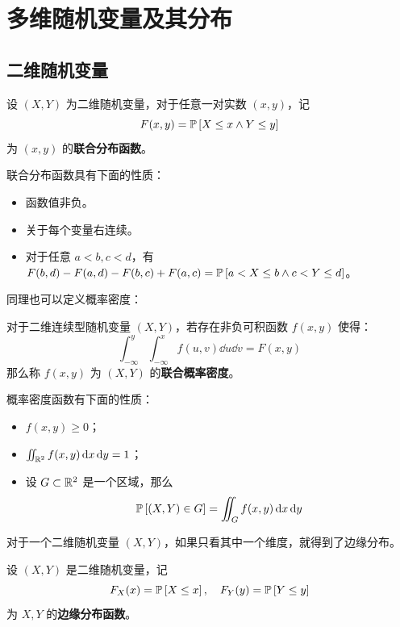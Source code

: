 \section{多维随机变量及其分布}

\subsection{二维随机变量}

\begin{definition}[联合分布函数]
    设 $(X, Y)$ 为二维随机变量，对于任意一对实数 $(x, y)$，记
    $$
    F(x, y) = \operatorname{\mathbb{P}}\left[X \le x \land Y \le y\right]
    $$
    为 $(x, y)$ 的\textbf{联合分布函数}。
\end{definition}

联合分布函数具有下面的性质：

\begin{itemize}
    \item 函数值非负。
    \item 关于每个变量右连续。
    \item 对于任意 $a < b, c < d$，有 $F(b, d) - F(a, d) - F(b, c) + F(a, c) = \operatorname{\mathbb{P}}\left[a < X \le b \land c < Y \le d\right]$。
\end{itemize}

同理也可以定义概率密度：

\begin{definition}[联合概率密度]
    对于二维连续型随机变量 $(X, Y)$，若存在非负可积函数 $f(x, y)$ 使得：
    $$
    \int_{-\infty}^{y} \int_{-\infty}^{x} f(u, v) \dd{u} \dd{v} = F(x, y)
    $$
    那么称 $f(x, y)$ 为 $(X, Y)$ 的\textbf{联合概率密度}。
\end{definition}

概率密度函数有下面的性质：

\begin{itemize}
    \item $f(x, y) \ge 0$；
    \item $\iint_{\mathbb{R}^2} f(x, y) \dd{x} \dd{y} = 1$；
    \item 设 $G \subset \mathbb{R}^2$ 是一个区域，那么
    $$
    \operatorname{\mathbb{P}}\left[(X, Y) \in G\right] = \iint_G f(x, y) \dd{x} \dd{y}
    $$
\end{itemize}

对于一个二维随机变量 $(X, Y)$，如果只看其中一个维度，就得到了边缘分布。

\begin{definition}[边缘分布函数]
    设 $(X, Y)$ 是二维随机变量，记
    $$
    F_X(x) = \operatorname{\mathbb{P}}\left[X \le x\right], \quad F_Y(y) = \operatorname{\mathbb{P}}\left[Y \le y\right]
    $$
    为 $X, Y$ 的\textbf{边缘分布函数}。
\end{definition}

